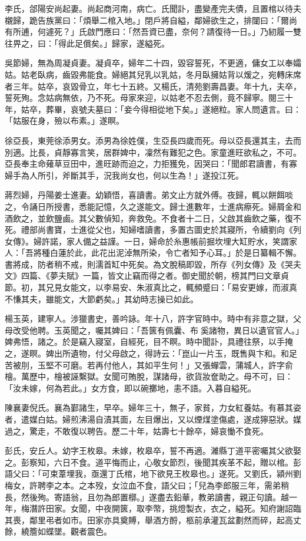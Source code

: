 \begin{pinyinscope}
李氏，郃陽安尚起妻。尚起商河南，病亡。氏聞訃，盡變產完夫債，且置棺以待夫櫬歸，跪告族黨曰：「煩舉二棺入地。」閉戶將自縊，鄰婦欲生之，排闥曰：「爾尚有所逋，何遽死？」氏啟門應曰：「然吾資已盡，奈何？請復待一日。」乃紉履一雙往畀之，曰：「得此足償矣。」歸家，遂縊死。

吳節婦，無為周凝貞妻。凝貞卒，婦年二十四，毀容誓死，不更適，傭女工以奉孀姑。姑老臥病，齒毀弗能食。婦絕其兒乳以乳姑，冬月臥擁姑背以煖之，宛轉床席者三年。姑卒，哀毀骨立，年七十五終。又楊氏，清苑劉壽昌妻。年十九，夫卒，誓死殉。念姑病無依，乃不死。母家來迎，以姑老不忍去側，竟不歸寧。閱三十年，姑卒，葬畢，哀號夫墓曰：「妾今得相從地下矣。」遂絕粒。家人問遺言。曰：「姑服在身，殮以布素。」遂瞑。

徐亞長，東莞徐添男女。添男為徐姓僕，生亞長四歲而死。母以亞長還其主，去而別適。比長，貞靜寡言笑，居群婢中，凜然有難犯之色。家童進旺欲私之，不可。亞長奉主命薙草豆田中，進旺跡而迫之，力拒獲免，因哭曰：「聞郎君讀書，有寡婦手為人所引，斧斷其手，況我尚女也，何以生為！」遂投江死。

蔣烈婦，丹陽姜士進妻。幼穎悟，喜讀書。弟文止方就外傅。夜歸，輒以餅餌啖之，令誦日所授書，悉能記憶，久之遂能文。歸士進數年，士進病瘵死。婦屑金和酒飲之，並飲鹽鹵。其父數偵知，奔救免。不食者十二日，父啟其齒飲之藥，復不死。禮部尚書寶，士進從父也，知婦嗜讀書，多置古圖史於其寢所，令續劉向《列女傳》。婦許諾，家人備之益謹。一日，婦命於糸惠帳前掘坎埋大缸貯水，笑謂家人：「吾將種白蓮於此，此花出泥淖無所染，令亡者知予心耳。」於是日纂輯不懈。書將成，防者稍不戒，則濡首缸中死矣。為文脫稿即毀，所存《列女傳》及《哭夫文》四篇、《夢夫賦》一篇，皆文止竊而得之者。御史聞於朝，榜其門曰文章貞節。初，其兄見女能文，以李易安、朱淑真比之，輒頻蹙曰：「易安更嫁，而淑真不慊其夫，雖能文，大節虧矣。」其幼時志操已如此。

楊玉英，建寧人。涉獵書史，善吟詠。年十八，許字官時中。時中有非意之獄，父母改受他聘。玉英聞之，囑其婢曰：「吾篋有佩囊、布奚諸物，異日以遺官官人。」婢弗悟，諸之。於是竊入寢室，自經死，目不瞑。時中聞訃，具禮往祭，以手掩之，遂瞑。婢出所遺物，付父母啟之，得詩云：「崑山一片玉，既售與卞和。和足苦被刖，玉堅不可磨。若再付他人，其如平生何！」又張蟬雲，蒲城人，許字俞檜。萬歷中，檜被誣繫獄。女聞可賄脫，謀諸母，欲貨妝奩助之。母不可，曰：「汝未嫁，何為若此。」女方食，即以碗擲地，恚不語。入暮自縊死。

陳襄妻倪氏。襄為鄞諸生，早卒。婦年三十，無子，家貧，力女紅養姑。有慕其姿者，遣媒白姑。婦煎沸湯自漬其面，左目爆出，又以煙煤塗傷處，遂成獰惡狀。媒過之，驚走，不敢復以聘告。歷二十年，姑壽七十餘卒，婦哀慟不食死。

彭氏，安丘人。幼字王枚皋。未嫁，枚皋卒，誓不再適。濰縣丁道平密囑其父欲娶之。彭察知，六日不食。道平悔而止，心敬女節烈，後聞其疾革不起，贈以棺。彭語父曰：「可束葦埋我，亟還丁氏棺，地下欲見王枚皋也。」遂死。又劉氏，潁州劉梅女，許聘李之本。之本歿，女泣血不食，語父曰；「兒為李郎服三年，需弟稍長，然後殉。寄語翁，且勿為郎置槨。」遂盡去鉛華，教弟讀書，親正句讀。越一年，梅潛許田家。女聞，中夜開篋，取李幣，挑燈製衣，衣之，縊死。知府謝詔臨其喪，鄰里弔者如市。田家亦具奠賻，舉酒方酹，柩前承灌瓦盆劃然而碎，起高丈餘，繞簷如蝶墜。觀者震色。


\end{pinyinscope}

